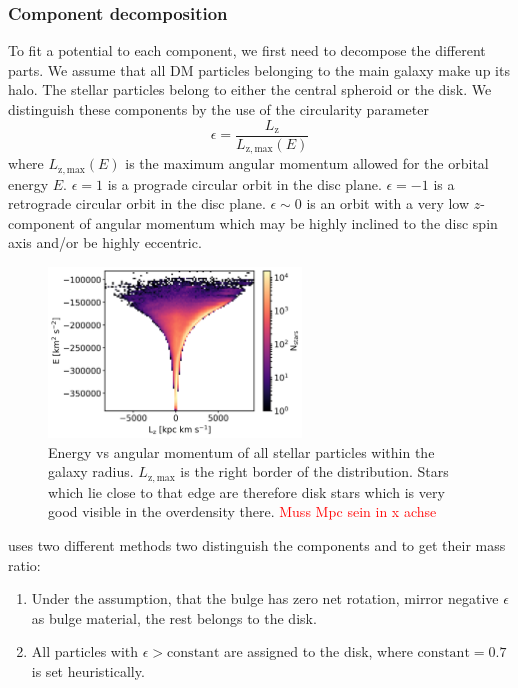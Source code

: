 \subsubsection{Component decomposition}\label{subsubsec:decomp}
To fit a potential to each component, we first need to decompose the different parts. We assume that all \ac{DM} particles belonging to the main galaxy make up its halo. The stellar particles belong to either the central spheroid or the disk. We distinguish these components by the use of the circularity parameter \citep{Abadi...circularity...2003}
\begin{equation}\label{eq:circularity}
    \epsilon = \frac{L_\mathrm{z}}{L_\mathrm{z,max}(E)}
\end{equation}
where $L_\mathrm{z,max}(E)$ is the maximum angular momentum allowed for the orbital energy $E$. 
$\epsilon = 1$ is a prograde circular orbit in the disc plane. $\epsilon = -1$ is a retrograde circular orbit in the disc plane. $\epsilon \sim 0$ is an orbit with a very low $z$-component of angular momentum which may be highly inclined to the disc spin axis and/or be highly eccentric.  
\begin{figure}
\captionsetup{format=plain}
    \centering
    \includegraphics[width = 0.6\textwidth]{plots/Auriga/decomposition_elz_snap_127.png}
    \caption{Energy vs angular momentum of all stellar particles within the galaxy radius. $L_\mathrm{z,max}$ is the right border of the distribution. Stars which lie close to that edge are therefore disk stars which is very good visible in the overdensity there. \textcolor{red}{Muss Mpc sein in x achse}}
    \label{fig:e_lz_dist}
\end{figure}

\cite{AurigaGrand} uses two different methods two distinguish the components and to get their mass ratio:
\begin{enumerate}
\item Under the assumption, that the bulge has zero net rotation, mirror negative $\epsilon$ as bulge material, the rest belongs to the disk.
\item All particles with $\epsilon > \mathrm{constant}$ are assigned to the disk, where $\mathrm{constant} = 0.7$ is set heuristically.
\end{enumerate}

